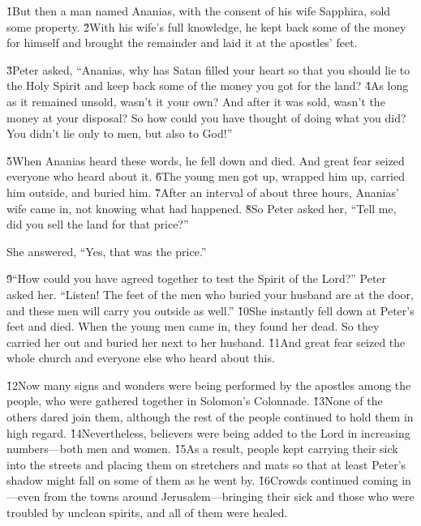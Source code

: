 \v{1}But then a man named Ananias, with the consent of his wife Sapphira, sold some property. \v{2}With his wife's full knowledge, he kept back some of the money for himself and brought the remainder and laid it at the apostles' feet.

\v{3}Peter asked, ``Ananias, why has Satan filled your heart so that you should lie to the Holy Spirit and keep back some of the money you got for the land? \v{4}As long as it remained unsold, wasn't it your own? And after it was sold, wasn't the money at your disposal? So how could you have thought of doing what you did? You didn't lie only to men, but also to God!''

\v{5}When Ananias heard these words, he fell down and died. And great fear seized everyone who heard about it. \v{6}The young men got up, wrapped him up, carried him outside, and buried him. \v{7}After an interval of about three hours, Ananias' wife came in, not knowing what had happened. \v{8}So Peter asked her, ``Tell me, did you sell the land for that price?''

She answered, ``Yes, that was the price.''

\v{9}``How could you have agreed together to test the Spirit of the Lord?'' Peter asked her. ``Listen! The feet of the men who buried your husband are at the door, and these men will carry you outside as well.'' \v{10}She instantly fell down at Peter's feet and died. When the young men came in, they found her dead. So they carried her out and buried her next to her husband. \v{11}And great fear seized the whole church and everyone else who heard about this.

\v{12}Now many signs and wonders were being performed by the apostles among the people, who were gathered together in Solomon's Colonnade. \v{13}None of the others dared join them, although the rest of the people continued to hold them in high regard. \v{14}Nevertheless, believers were being added to the Lord in increasing numbers---both men and women. \v{15}As a result, people kept carrying their sick into the streets and placing them on stretchers and mats so that at least Peter's shadow might fall on some of them as he went by. \v{16}Crowds continued coming in---even from the towns around Jerusalem---bringing their sick and those who were troubled by unclean spirits, and all of them were healed.

